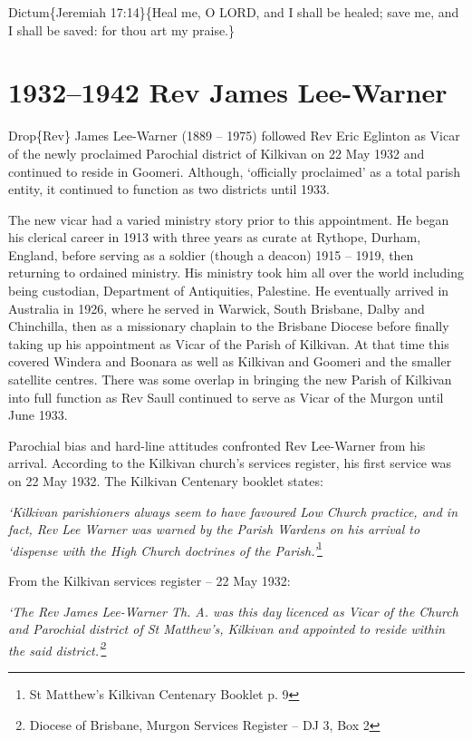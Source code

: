 Dictum\{Jeremiah 17:14\}\{Heal me, O LORD, and I shall be healed; save me, and I shall be saved: for thou art my praise.\}

\hypertarget{rev-james-lee-warner}{%
\chapter{1932--1942 Rev James Lee-Warner}\label{rev-james-lee-warner}}

Drop\{Rev\} James Lee-Warner (1889 -- 1975) followed Rev Eric Eglinton as Vicar of the newly proclaimed Parochial district of Kilkivan on 22 May 1932 and continued to reside in Goomeri. Although, `officially proclaimed' as a total parish entity, it continued to function as two districts until 1933.

The new vicar had a varied ministry story prior to this appointment. He began his clerical career in 1913 with three years as curate at Rythope, Durham, England, before serving as a soldier (though a deacon) 1915 -- 1919, then returning to ordained ministry. His ministry took him all over the world including being custodian, Department of Antiquities, Palestine. He eventually arrived in Australia in 1926, where he served in Warwick, South Brisbane, Dalby and Chinchilla, then as a missionary chaplain to the Brisbane Diocese before finally taking up his appointment as Vicar of the Parish of Kilkivan. At that time this covered Windera and Boonara as well as Kilkivan and Goomeri and the smaller satellite centres. There was some overlap in bringing the new Parish of Kilkivan into full function as Rev Saull continued to serve as Vicar of the Murgon until June 1933.

Parochial bias and hard-line attitudes confronted Rev Lee-Warner from his arrival. According to the Kilkivan church's services register, his first service was on 22 May 1932. The Kilkivan Centenary booklet states:

\emph{`Kilkivan parishioners always seem to have favoured Low Church practice, and in fact, Rev Lee Warner was warned by the Parish Wardens on his arrival to `dispense with the High Church doctrines of the Parish.'}\footnote{St Matthew's Kilkivan Centenary Booklet p. 9}

From the Kilkivan services register -- 22 May 1932:

\emph{`The Rev James Lee-Warner Th. A. was this day licenced as Vicar of the Church and Parochial district of St Matthew's, Kilkivan and appointed to reside within the said district.'}\footnote{Diocese of Brisbane, Murgon Services Register -- DJ 3, Box 2}

